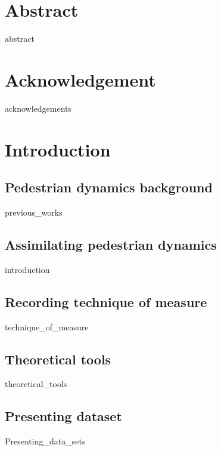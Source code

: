 \documentclass[10pt,a4paper]{report}
\begin{document}

\chapter*{Abstract}
	{abstract}



\chapter*{Acknowledgement}
	{acknowledgements}



\tableofcontents



\chapter{Introduction}

\FloatBarrier
\section{Pedestrian dynamics background}
	{previous_works}

\FloatBarrier
\section{Assimilating pedestrian dynamics}
	{introduction}

\FloatBarrier
\section{Recording technique of measure}
	{technique_of_measure}

\FloatBarrier
\section{Theoretical tools}
	{theoretical_tools}

\FloatBarrier
\section{Presenting dataset}
	{Presenting_data_sets}
\end{document}
